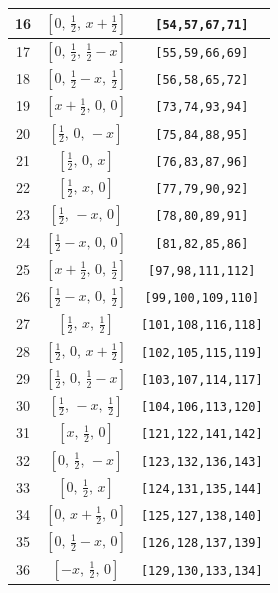 \documentclass[fleqn,8pt]{jsarticle}
\begin{document}
\begin{longtable}{ccc}
16 & $\left[ 0,\, \frac{1}{2},\, x + \frac{1}{2} \right]$ & {\tt [54,57,67,71]} \\ \hline
17 & $\left[ 0,\, \frac{1}{2},\, \frac{1}{2} - x \right]$ & {\tt [55,59,66,69]} \\ \hline
18 & $\left[ 0,\, \frac{1}{2} - x,\, \frac{1}{2} \right]$ & {\tt [56,58,65,72]} \\ \hline
19 & $\left[ x + \frac{1}{2},\, 0,\, 0 \right]$ & {\tt [73,74,93,94]} \\ \hline
20 & $\left[ \frac{1}{2},\, 0,\, - x \right]$ & {\tt [75,84,88,95]} \\ \hline
21 & $\left[ \frac{1}{2},\, 0,\, x \right]$ & {\tt [76,83,87,96]} \\ \hline
22 & $\left[ \frac{1}{2},\, x,\, 0 \right]$ & {\tt [77,79,90,92]} \\ \hline
23 & $\left[ \frac{1}{2},\, - x,\, 0 \right]$ & {\tt [78,80,89,91]} \\ \hline
24 & $\left[ \frac{1}{2} - x,\, 0,\, 0 \right]$ & {\tt [81,82,85,86]} \\ \hline
25 & $\left[ x + \frac{1}{2},\, 0,\, \frac{1}{2} \right]$ & {\tt [97,98,111,112]} \\ \hline
26 & $\left[ \frac{1}{2} - x,\, 0,\, \frac{1}{2} \right]$ & {\tt [99,100,109,110]} \\ \hline
27 & $\left[ \frac{1}{2},\, x,\, \frac{1}{2} \right]$ & {\tt [101,108,116,118]} \\ \hline
28 & $\left[ \frac{1}{2},\, 0,\, x + \frac{1}{2} \right]$ & {\tt [102,105,115,119]} \\ \hline
29 & $\left[ \frac{1}{2},\, 0,\, \frac{1}{2} - x \right]$ & {\tt [103,107,114,117]} \\ \hline
30 & $\left[ \frac{1}{2},\, - x,\, \frac{1}{2} \right]$ & {\tt [104,106,113,120]} \\ \hline
31 & $\left[ x,\, \frac{1}{2},\, 0 \right]$ & {\tt [121,122,141,142]} \\ \hline
32 & $\left[ 0,\, \frac{1}{2},\, - x \right]$ & {\tt [123,132,136,143]} \\ \hline
33 & $\left[ 0,\, \frac{1}{2},\, x \right]$ & {\tt [124,131,135,144]} \\ \hline
34 & $\left[ 0,\, x + \frac{1}{2},\, 0 \right]$ & {\tt [125,127,138,140]} \\ \hline
35 & $\left[ 0,\, \frac{1}{2} - x,\, 0 \right]$ & {\tt [126,128,137,139]} \\ \hline
36 & $\left[ - x,\, \frac{1}{2},\, 0 \right]$ & {\tt [129,130,133,134]} \\ \hline

\end{longtable}
\end{document}
